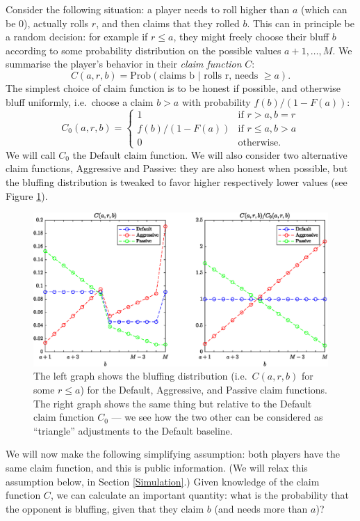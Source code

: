 \documentclass[12pt]{article}
\begin{document}
Consider the following situation: a player needs to roll higher than $a$ (which can be 0), actually rolls $r$, and then claims that they rolled $b$. This can in principle be a random decision: for example if $r \leq a$, they might freely choose their bluff $b$ according to some probability distribution on the possible values $a+1,\ldots,M$. We summarise the player's behavior in their \emph{claim function} $C$:
$$
C(a,r,b) = \textrm{Prob}(\textrm{claims b } | \textrm{ rolls r, needs } \geq a).
$$
The simplest choice of claim function is to be honest if possible, and otherwise bluff uniformly, i.e.\ choose a claim $b > a$ with probability $f(b)/(1-F(a))$:
$$
C_0(a,r,b) = \left\{\begin{array}{ll} 
1 & \textrm{if } r > a, b = r\\ 
f(b)/(1-F(a)) & \textrm{if } r \leq a, b > a\\
0 & \textrm{otherwise.}
\end{array}\right.
$$
We will call $C_0$ the Default claim function. We will also consider two alternative claim functions, Aggressive and Passive: they are also honest when possible, but the bluffing distribution is tweaked to favor higher respectively lower values (see Figure \ref{showC}).

\begin{figure}
  \includegraphics[width=\linewidth]{showC.eps}
  \caption{The left graph shows the bluffing distribution (i.e.\ $C(a,r,b)$ for some $r \leq a$) for the Default, Aggressive, and Passive claim functions. The right graph shows the same thing but relative to the Default claim function $C_0$ --- we see how the two other can be considered as ``triangle'' adjustments to the Default baseline.}
  \label{showC}
\end{figure}

We will now make the following simplifying assumption: both players have the same claim function, and this is public information. (We will relax this assumption below, in Section \ref{Simulation}.) Given knowledge of the claim function $C$, we can calculate an important quantity: what is the probability that the opponent is bluffing, given that they claim $b$ (and needs more than $a$)?
\end{document}

